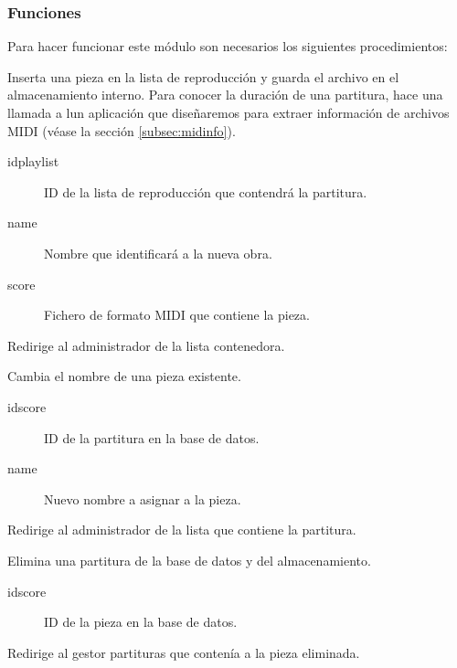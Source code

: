 \smallskip

\subsubsection{Funciones}

Para hacer funcionar este módulo son necesarios los siguientes procedimientos:

\begin{description}[style=nextline]
	\item[new\_score (idplaylist, name, score)]
	Inserta una pieza en la lista de reproducción y guarda el archivo en el almacenamiento interno. Para conocer la duración de una partitura, hace una llamada a lun aplicación que diseñaremos para extraer información de archivos \acrshort{MIDI} (véase la sección \ref{subsec:midinfo}).
	
	\begin{description}
		\item[idplaylist] ID de la lista de reproducción que contendrá la partitura.
		\item[name] Nombre que identificará a la nueva obra.
		\item[score] Fichero de formato \acrshort{MIDI} que contiene la pieza.
	\end{description}
	
	Redirige al administrador de la lista contenedora.
	
	\item[rename\_score (idscore, name)]
	Cambia el nombre de una pieza existente.
	
	\begin{description}
		\item[idscore] ID de la partitura en la base de datos.
		\item[name] Nuevo nombre a asignar a la pieza.
	\end{description}
	
	Redirige al administrador de la lista que contiene la partitura.
	
	\item[delete\_score (idscore)]
	Elimina una partitura de la base de datos y del almacenamiento.
	
	\begin{description}
		\item[idscore] ID de la pieza en la base de datos.
	\end{description}
	
	Redirige al gestor partituras que contenía a la pieza eliminada.
	
\end{description}


